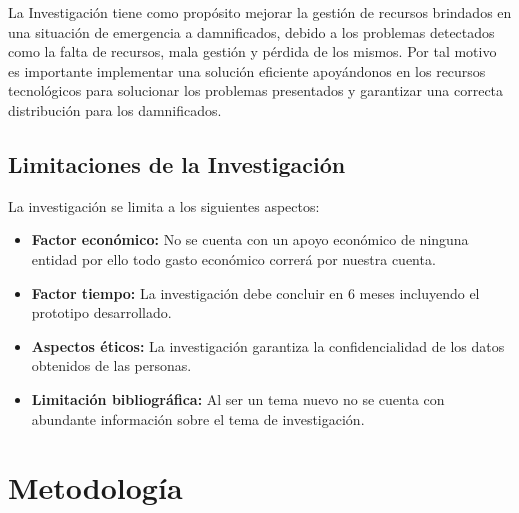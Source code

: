 \documentclass[11pt,openany]{book}
\begin{document}
	La Investigación tiene como propósito mejorar la gestión de recursos brindados en una situación de emergencia a damnificados, debido a los problemas detectados como la falta de recursos, mala gestión y pérdida de los mismos. Por tal motivo es importante implementar una solución eficiente apoyándonos en los recursos tecnológicos para solucionar los problemas presentados y garantizar una correcta distribución para los damnificados.\\

	\section{Limitaciones de la Investigación}

	La investigación se limita a los siguientes aspectos:
	\begin{itemize}
		\item \textbf{Factor económico: }No se cuenta con un apoyo económico de ninguna entidad por ello todo gasto económico correrá por nuestra cuenta.
		\item \textbf{Factor tiempo: }La investigación debe concluir en 6 meses incluyendo el prototipo desarrollado.
		\item \textbf{Aspectos éticos: }La investigación garantiza la confidencialidad de los datos obtenidos de las personas.
		\item \textbf{Limitación bibliográfica: }Al ser un tema nuevo no se cuenta con abundante información sobre el tema de investigación.
	\end{itemize}

	\chapter{Metodología}
	
	\newpage
\end{document}
